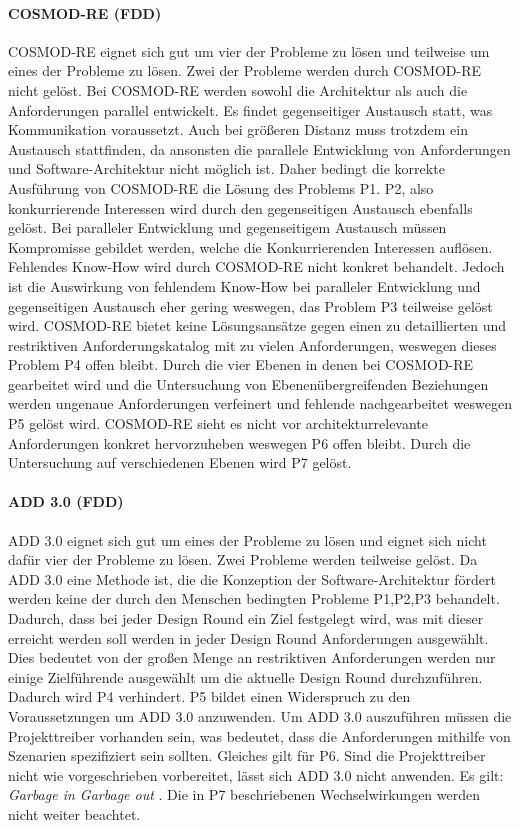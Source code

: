 \paragraph{COSMOD-RE (FDD)}
COSMOD-RE eignet sich gut um vier der Probleme zu l\"osen und teilweise um eines der Probleme zu l\"osen. Zwei der Probleme werden durch COSMOD-RE nicht gel\"ost. Bei COSMOD-RE werden sowohl die Architektur als auch die Anforderungen parallel entwickelt. Es findet gegenseitiger Austausch statt, was Kommunikation voraussetzt. Auch bei gr\"o\ss{}eren Distanz muss trotzdem ein Austausch stattfinden, da ansonsten die parallele Entwicklung von Anforderungen und Software-Architektur nicht m\"oglich ist. Daher bedingt die korrekte Ausf\"uhrung von COSMOD-RE die L\"osung des Problems P1. P2, also konkurrierende Interessen wird durch den gegenseitigen Austausch ebenfalls gel\"ost. Bei paralleler Entwicklung und gegenseitigem Austausch m\"ussen Kompromisse gebildet werden, welche die Konkurrierenden Interessen aufl\"osen. Fehlendes Know-How wird durch COSMOD-RE nicht konkret behandelt. Jedoch ist die Auswirkung von fehlendem Know-How bei paralleler Entwicklung und gegenseitigen Austausch eher gering weswegen, das Problem P3 teilweise gel\"ost wird. COSMOD-RE bietet keine L\"osungsans\"atze gegen einen zu detaillierten und restriktiven Anforderungskatalog mit zu vielen Anforderungen, weswegen dieses Problem P4 offen bleibt. Durch die vier Ebenen in denen bei COSMOD-RE gearbeitet wird und die Untersuchung von Ebenen\"ubergreifenden Beziehungen werden ungenaue Anforderungen verfeinert und fehlende nachgearbeitet weswegen P5 gel\"ost wird. COSMOD-RE sieht es nicht vor architekturrelevante Anforderungen konkret hervorzuheben weswegen P6 offen bleibt. Durch die Untersuchung auf verschiedenen Ebenen wird P7 gel\"ost.\\

\paragraph{ADD 3.0 (FDD)}
ADD 3.0 eignet sich gut um eines der Probleme zu l\"osen und eignet sich nicht daf\"ur vier der Probleme zu l\"osen. Zwei Probleme werden teilweise gel\"ost. Da ADD 3.0 eine Methode ist, die die Konzeption der Software-Architektur f\"ordert werden keine der durch den Menschen bedingten Probleme P1,P2,P3 behandelt. Dadurch, dass bei jeder Design Round ein Ziel festgelegt wird, was mit dieser erreicht werden soll werden in jeder Design Round Anforderungen ausgew\"ahlt. Dies bedeutet von der gro\ss{}en Menge an restriktiven Anforderungen werden nur einige Zielf\"uhrende ausgew\"ahlt um die aktuelle Design Round durchzuf\"uhren. Dadurch wird P4 verhindert. P5 bildet einen Widerspruch zu den Voraussetzungen um ADD 3.0 anzuwenden. Um ADD 3.0 auszuf\"uhren m\"ussen die Projekttreiber vorhanden sein, was bedeutet, dass die Anforderungen mithilfe von Szenarien spezifiziert sein sollten. Gleiches gilt f\"ur P6. Sind die Projekttreiber nicht wie vorgeschrieben vorbereitet, l\"asst sich ADD 3.0 nicht anwenden. Es gilt: \emph{Garbage in Garbage out }\cite{Cer01}. Die in P7 beschriebenen Wechselwirkungen werden nicht weiter beachtet.\\
